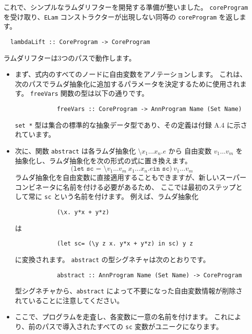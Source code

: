 \documentclass{jarticle}
\begin{document}
これで、シンプルなラムダリフターを開発する準備が整いました。
\texttt{coreProgram} を受け取り、\texttt{ELam} コンストラクターが出現しない同等の \texttt{coreProgram} を返します。

\begin{verbatim}
  lambdaLift :: CoreProgram -> CoreProgram
\end{verbatim}

ラムダリフターは3つのパスで動作します。

\begin{itemize}
	\item まず、式内のすべてのノードに自由変数をアノテーションします。
	      これは、次のパスでラムダ抽象化に追加するパラメータを決定するために使用されます。
	      \texttt{freeVars} 関数の型は以下の通りです。
          \begin{verbatim}
            freeVars :: CoreProgram -> AnnProgram Name (Set Name)
          \end{verbatim}
	      \texttt{set *} 型は集合の標準的な抽象データ型であり、その定義は付録 A.4 に示されています。
	\item 次に、関数 \texttt{abstract} は各ラムダ抽象化 $\texttt{\textbackslash}x_1 \ldots x_n \texttt{.} e$ から
	      自由変数 $v_1 \ldots v_m$ を抽象化し、ラムダ抽象化を次の形式の式に置き換えます。
          \[
              \texttt{(let sc = \textbackslash}v_1 \ldots v_m ~ x_1 \ldots x_n \texttt{.} e \texttt{in sc}) ~ v_1 \ldots v_m
          \]
	      ラムダ抽象化を自由変数に直接適用することもできますが、新しいスーパーコンビネータに名前を付ける必要があるため、
	      ここでは最初のステップとして常に \texttt{sc} という名前を付けます。
	      例えば、ラムダ抽象化
	      \begin{verbatim}
			(\x. y*x + y*z)
		  \end{verbatim}
	      は
	      \begin{verbatim}
			(let sc= (\y z x. y*x + y*z) in sc) y z
		  \end{verbatim}
	      に変換されます。
	      \texttt{abstract} の型シグネチャは次のとおりです。
          \begin{verbatim}
        	abstract :: AnnProgram Name (Set Name) -> CoreProgram
          \end{verbatim}
	      型シグネチャから、\texttt{abstract} によって不要になった自由変数情報が削除されていることに注意してください。
	\item ここで、プログラムを走査し、各変数に一意の名前を付けます。
	      これにより、前のパスで導入されたすべての \texttt{sc} 変数がユニークになります。

\end{itemize}
\end{document}
